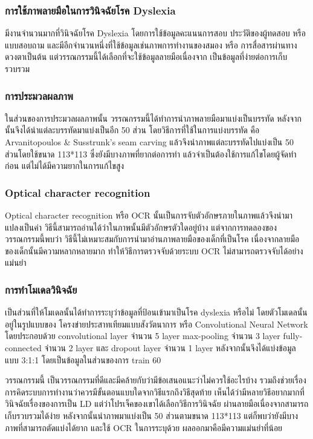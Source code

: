 \documentclass[12pt,oneside,openright,a4paper]{cpe-thai-project}
\begin{document}
\subsubsection{การใช้ภาพลายมือในการวินิจฉัยโรค Dyslexia}
มีงานจำนวนมากที่วินิจฉัยโรค Dyslexia โดยการใช้ข้อมูลคะแนนการสอบ ประวัติของผู้ทดสอบ หรือ แบบสอบถาม และมีอีกจำนวนหนึ่งที่ใช้ข้อมูลเช่นภาพการทำงานของสมอง หรือ การสื่อสารผ่านทางดวงตาเป็นต้น 
แต่วรรณกรรมนี้ได้เลือกที่จะใช้ข้อมูลลายมือเนื่องจาก เป็นข้อมูลที่ง่ายต่อการเก็บรวบรวม


\subsubsection{การประมวลผลภาพ}
ในส่วนของการประมวลผลภาพนั้น วรรณกรรมนี้ได้ทำการนำภาพลายมือมาแบ่งเป็นบรรทัด 
หลังจากนั้นจึงได้นำแต่ละบรรทัดมาแบ่งเป็นอีก 50 ส่วน โดยวิธีการที่ใช้ในการแบ่งบรรทัด คือ 
 Arvanitopoulos & Susstrunk’s seam carving แล้วจึงนำภาพแต่ละบรรทัดไปแบ่งเป็น 50 
 ส่วนโดยใช้ขนาด 113*113 ซึ่งยังมีบางภาพที่ยากต่อการทำ แล้วจำเป็นต้องใช้การแก้ไขโดยผู้จัดทำก่อน แต่ไม่ได้มีความยากในการแก้ไขสูง

 \subsubsection{Optical character recognition}
 Optical character recognition หรือ OCR นั้นเป็นการจับตัวอักษรภายในภาพแล้วจึงนำมาแปลงเป็นค่า
  วิธีนี้สามารถอ่านได้ว่าในภาพนั้นมีตัวอักษรตัวใดอยู่บ้าง แต่จากการทดลองของวรรณกรรมนี้พบว่า 
  วิธีนี้ไม่เหมาะสมกับการนำมาอ่านภาพลายมือของเด็กที่เป็นโรค 
  เนื่องจากลายมือของเด็กนั้นมีความหลากหลายมาก ทำให้วิธีการตรวจจับด้วยระบบ OCR ไม่สามารถตรวจจับได้อย่างแม่นยำ
\subsubsection{การทำโมเดลวินิจฉัย}
เป็นส่วนที่ให้โมเดลนั้นได้ทำการระบุว่าข้อมูลที่ป้อนเข้ามาเป็นโรค dyslexia หรือไม่ 
โดยตัวโมเดลนั้นอยู่ในรูปแบบของ  โครงข่ายประสาทเทียมแบบสังวัตนาการ 
หรือ Convolutional Neural Network โดยประกอบด้วย convolutional layer จำนวน 5 layer 
max-pooling จำนวน 3 layer fully-connected จำนวน 2 layer และ dropout layer จำนวน 1 layer 
หลังจากนั้นจึงได้แบ่งข้อมูลแบบ 3:1:1 โดยเป็นข้อมูลในส่วนของการ train 60%

วรรณกรรมนี้ เป็นวรรณกรรมที่ดีและมีคล้ายกับว่ามีข้อเสนอแนะว่าไม่ควรใช้อะไรบ้าง 
รวมถึงช่วยเรื่องการคิดระบบการทำงานว่าควรมีขั้นตอนแบบใดจากวิธีแรกถึงวิธีสุดท้าย
 เห็นได้ว่ามีหลายวิธีอยากมากที่วินิจฉัยเรื่องของการเป็น LD แต่ว่าโปรเจ็คของเขาได้เลือกวิธีการวินิจฉัย
 ผ่านลายมือเนื่องจากสามารถเก็บรวบรวมได้ง่าย หลังจากนั้นนำภาพมาแบ่งเป็น 50 ส่วนตามขนาด 113*113 
 แต่ก็พบว่ายังมีบางภาพที่สามารถตัดแบ่งได้ยาก และใช้ OCR ในการระบุด้วย ผลออกมาคือมีความแม่นยำที่น้อย
\end{document}
